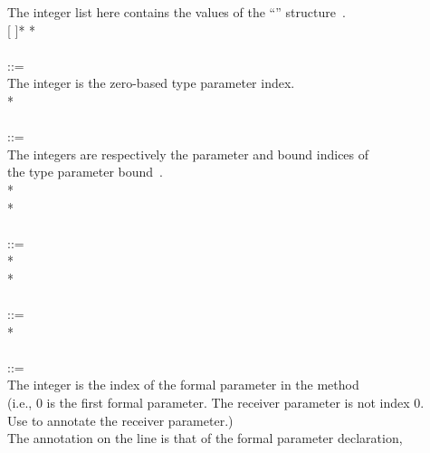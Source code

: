 \documentclass{article}
\begin{document}
\begin{tabbing}
\qquad    \bnfcmt The integer list here contains the values of the ``'' structure~\cite{JSR308}. \\ %
\qquad    {}  \bnflit{,}  [ \bnflit{,}  \bnflit{,}  ]* \bnflit{:} * \lineend \\
\\
 ::= \\
\qquad    \bnfcmt The integer is the zero-based type parameter index. \\
\qquad    {}  \bnflit{:} * \lineend\\
\\
 ::= \\
\qquad    \bnfcmt The integers are respectively the parameter and bound indices of \\
\qquad    \bnfcmt the type parameter bound~\cite{JSR308}. \\
\qquad    {}  \bnflit{\&}  \bnflit{:}
* \lineend \\
\qquad    {}* \\
\\
 ::=  \\
\qquad    {} * \lineend \\
\qquad        {}* \\
\\
 ::=  \\
\qquad    {} * \lineend \\
\\
 ::= \\
\qquad    \bnfcmt The integer is the index of the formal parameter in the method \\
\qquad    \bnfcmt (i.e., 0 is the first formal parameter. The receiver parameter is not index 0. \\
\qquad    \bnfcmt Use  to annotate the receiver parameter.) \\
\qquad    \bnfcmt The annotation on the  line is that of the formal parameter declaration, \\

\end{tabbing}
\end{document}
